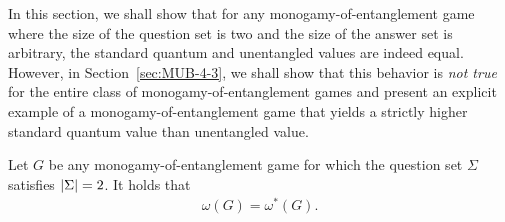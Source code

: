 In this section, we shall show that for any monogamy-of-entanglement game where the size of the question set is two and the size of the answer set is arbitrary, the standard quantum and unentangled values are indeed equal. However, in Section~\ref{sec:MUB-4-3}, we shall show that this behavior is \emph{not true} for the entire class of monogamy-of-entanglement games and present an explicit example of a monogamy-of-entanglement game that yields a strictly higher standard quantum value than unentangled value.  

\begin{theorem}
	Let $G$ be any monogamy-of-entanglement game for which the question set $\Sigma$ satisfies $\left\lvert \Sigma \right\rvert=2$. It holds that 
	\begin{align}
		\omega(G) = \omega^*(G).
	\end{align}
\end{theorem}

